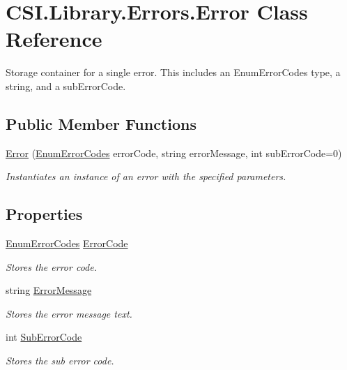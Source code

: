 \hypertarget{class_c_s_i_1_1_library_1_1_errors_1_1_error}{}\section{C\+S\+I.\+Library.\+Errors.\+Error Class Reference}
\label{class_c_s_i_1_1_library_1_1_errors_1_1_error}


Storage container for a single error. This includes an Enum\+Error\+Codes type, a string, and a sub\+Error\+Code.  


\subsection*{Public Member Functions}
\begin{DoxyCompactItemize}
\item 
\mbox{\hyperlink{class_c_s_i_1_1_library_1_1_errors_1_1_error_abae0450771193ad31c3b2ce02afc1a12}{Error}} (\mbox{\hyperlink{namespace_c_s_i_1_1_library_1_1_errors_a5534735de1ef2256eb4c52c7440e30d7}{Enum\+Error\+Codes}} error\+Code, string error\+Message, int sub\+Error\+Code=0)
\begin{DoxyCompactList}\small\item\em Instantiates an instance of an error with the specified parameters. \end{DoxyCompactList}\end{DoxyCompactItemize}
\subsection*{Properties}
\begin{DoxyCompactItemize}
\item 
\mbox{\hyperlink{namespace_c_s_i_1_1_library_1_1_errors_a5534735de1ef2256eb4c52c7440e30d7}{Enum\+Error\+Codes}} \mbox{\hyperlink{class_c_s_i_1_1_library_1_1_errors_1_1_error_adf0db212e1ad61cd2c2575dee9213d2a}{Error\+Code}}
\begin{DoxyCompactList}\small\item\em Stores the error code. \end{DoxyCompactList}\item 
string \mbox{\hyperlink{class_c_s_i_1_1_library_1_1_errors_1_1_error_a83f01ebbb48d1cb6412cd42a011b0889}{Error\+Message}}
\begin{DoxyCompactList}\small\item\em Stores the error message text. \end{DoxyCompactList}\item 
int \mbox{\hyperlink{class_c_s_i_1_1_library_1_1_errors_1_1_error_ad0e36824c48ef4ad7bcfb0b90c24263d}{Sub\+Error\+Code}}
\begin{DoxyCompactList}\small\item\em Stores the sub error code. \end{DoxyCompactList}\end{DoxyCompactItemize}


